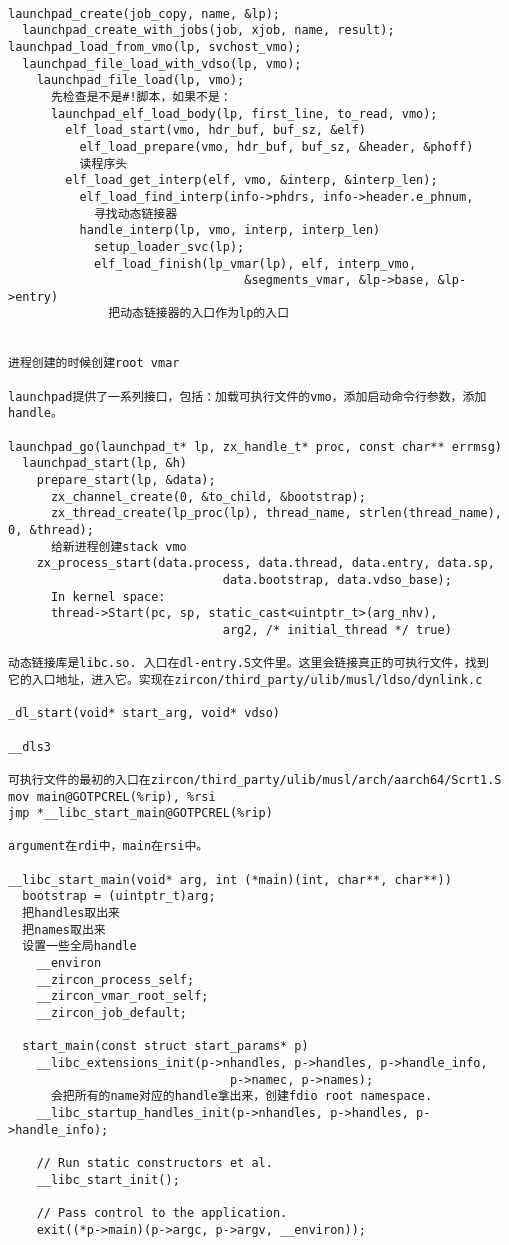 \begin{verbatim}

launchpad_create(job_copy, name, &lp);
  launchpad_create_with_jobs(job, xjob, name, result);
launchpad_load_from_vmo(lp, svchost_vmo);
  launchpad_file_load_with_vdso(lp, vmo);
    launchpad_file_load(lp, vmo);
      先检查是不是#!脚本，如果不是：
      launchpad_elf_load_body(lp, first_line, to_read, vmo);
        elf_load_start(vmo, hdr_buf, buf_sz, &elf)
          elf_load_prepare(vmo, hdr_buf, buf_sz, &header, &phoff)
          读程序头
        elf_load_get_interp(elf, vmo, &interp, &interp_len);
          elf_load_find_interp(info->phdrs, info->header.e_phnum,
            寻找动态链接器
          handle_interp(lp, vmo, interp, interp_len)
            setup_loader_svc(lp);
            elf_load_finish(lp_vmar(lp), elf, interp_vmo,
                                 &segments_vmar, &lp->base, &lp->entry)
              把动态链接器的入口作为lp的入口


进程创建的时候创建root vmar

launchpad提供了一系列接口，包括：加载可执行文件的vmo，添加启动命令行参数，添加handle。

launchpad_go(launchpad_t* lp, zx_handle_t* proc, const char** errmsg)
  launchpad_start(lp, &h)
    prepare_start(lp, &data);
      zx_channel_create(0, &to_child, &bootstrap);
      zx_thread_create(lp_proc(lp), thread_name, strlen(thread_name), 0, &thread);
      给新进程创建stack vmo
    zx_process_start(data.process, data.thread, data.entry, data.sp,
                              data.bootstrap, data.vdso_base);
      In kernel space:
      thread->Start(pc, sp, static_cast<uintptr_t>(arg_nhv),
                              arg2, /* initial_thread */ true)              

动态链接库是libc.so. 入口在dl-entry.S文件里。这里会链接真正的可执行文件，找到
它的入口地址，进入它。实现在zircon/third_party/ulib/musl/ldso/dynlink.c

_dl_start(void* start_arg, void* vdso)

__dls3

可执行文件的最初的入口在zircon/third_party/ulib/musl/arch/aarch64/Scrt1.S
mov main@GOTPCREL(%rip), %rsi
jmp *__libc_start_main@GOTPCREL(%rip)

argument在rdi中，main在rsi中。

__libc_start_main(void* arg, int (*main)(int, char**, char**))
  bootstrap = (uintptr_t)arg;
  把handles取出来
  把names取出来
  设置一些全局handle
    __environ
    __zircon_process_self;
    __zircon_vmar_root_self;
    __zircon_job_default;

  start_main(const struct start_params* p)
    __libc_extensions_init(p->nhandles, p->handles, p->handle_info,
                               p->namec, p->names);
      会把所有的name对应的handle拿出来，创建fdio root namespace.
    __libc_startup_handles_init(p->nhandles, p->handles, p->handle_info);

    // Run static constructors et al.
    __libc_start_init();
                           
    // Pass control to the application.
    exit((*p->main)(p->argc, p->argv, __environ));  

\end{verbatim}